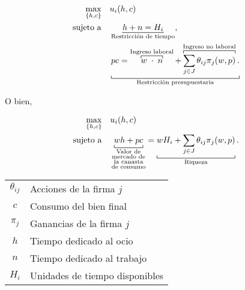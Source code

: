 \documentclass[8pt,a4paper]{extarticle}
\begin{document}
\begin{multicols}{3}
	\begin{equation*}
		\begin{aligned}
			\max_{\{h, c\}} \quad & u_i(h, c)                                                                                                                                                                                                                                                     \\
			\text{sujeto a} \quad & \underbracket[0.5pt][0.5pt]{h + n = H_i}_{\text{\normalfont Restricción de tiempo}},                                                                                                                                                                          \\
			                      & \underbracket[0.5pt]{pc = \overbracket[0.5pt]{w \; \cdot \;  n}^{\text{\normalfont Ingreso laboral}} + \overbracket[0.5pt]{\sum_{j \in J} \theta_{ij} \pi_j (w, p)}^{\text{\normalfont Ingreso no laboral}}.}_{\text{\normalfont Restricción presupuestaria}}
		\end{aligned}
	\end{equation*}

	O bien,

	\begin{equation*}
		\begin{aligned}
			\max_{\{h, c\}} \quad & u_i(h, c)                                                            \\
			\text{sujeto a} \quad & \underbracket[0.5pt]{wh + pc}_{\substack{\text{\normalfont Valor de} \\ \text{\normalfont mercado de} \\ \text{\normalfont la canasta} \\\text{\normalfont de consumo} }} = \underbracket[0.5pt]{wH_i + \sum_{j \in J} \theta_{ij} \pi_j (w, p)}_{\text{\normalfont Riqueza}}.
		\end{aligned}
	\end{equation*}

	\begin{center}
		\begin{tabular}{ c l }
			\hline
			$\theta_{ij}$ & Acciones de la firma $j$       \\
			$c$           & Consumo del bien final         \\
			$\pi_j$       & Ganancias de la firma $j$      \\
			$h$           & Tiempo dedicado al ocio        \\
			$n$           & Tiempo dedicado al trabajo     \\
			$H_i$         & Unidades de tiempo disponibles \\
			\hline
		\end{tabular}
	\end{center}


\end{multicols}
\end{document}
